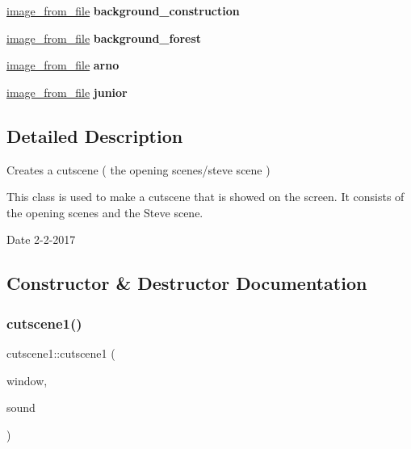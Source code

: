 \begin{DoxyCompactItemize}
\hyperlink{classimage__from__file}{image\+\_\+from\+\_\+file} {\bfseries background\+\_\+construction}
\item 
\mbox{\label{classcutscene1_aea0d799f8702cc71982bab75849f069b}} 
\hyperlink{classimage__from__file}{image\+\_\+from\+\_\+file} {\bfseries background\+\_\+forest}
\item 
\mbox{\label{classcutscene1_a94bafeada4183ac74b03e0586202c9ed}} 
\hyperlink{classimage__from__file}{image\+\_\+from\+\_\+file} {\bfseries arno}
\item 
\mbox{\label{classcutscene1_afe362946a8e2b1a2257b6e993e3b2188}} 
\hyperlink{classimage__from__file}{image\+\_\+from\+\_\+file} {\bfseries junior}
\end{DoxyCompactItemize}


\subsection{Detailed Description}
Creates a cutscene ( the opening scenes/steve scene ) 

This class is used to make a cutscene that is showed on the screen. It consists of the opening scenes and the Steve scene.

\begin{DoxyDate}{Date}
2-\/2-\/2017 
\end{DoxyDate}


\subsection{Constructor \& Destructor Documentation}
\mbox{\label{classcutscene1_acf92c92aba72e1858d7ace167c231ece}} 
\subsubsection{\texorpdfstring{cutscene1()}{cutscene1()}}
{\footnotesize\ttfamily cutscene1\+::cutscene1 (\begin{DoxyParamCaption}\item[{sf\+::\+Render\+Window \&}]{window,  }\item[{\hyperlink{classsoundtrack}{soundtrack} \&}]{sound }\end{DoxyParamCaption})}



